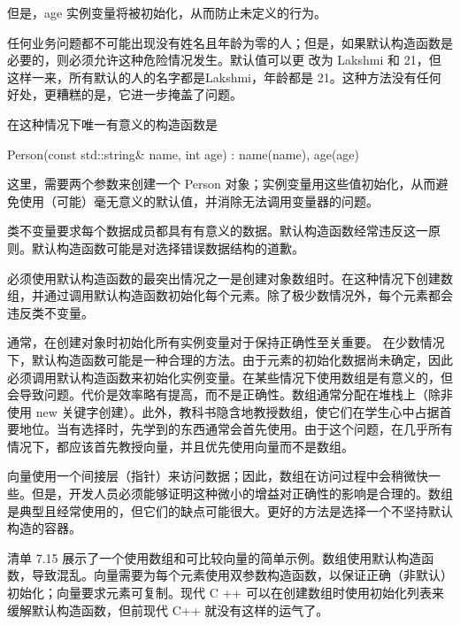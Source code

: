 但是，age 实例变量将被初始化，从而防止未定义的行为。


任何业务问题都不可能出现没有姓名且年龄为零的人；但是，如果默认构造函数是必要的，则必须允许这种危险情况发生。默认值可以更 改为 Lakshmi 和 21，但这样一来，所有默认的人的名字都是Lakshmi，年龄都是 21。这种方法没有任何好处，更糟糕的是，它进一步掩盖了问题。

在这种情况下唯一有意义的构造函数是

\begin{cpp}
Person(const std::string& name, int age) : name(name), age(age) {}
\end{cpp}

这里，需要两个参数来创建一个 Person 对象；实例变量用这些值初始化，从而避免使用（可能）毫无意义的默认值，并消除无法调用变量器的问题。

类不变量要求每个数据成员都具有有意义的数据。默认构造函数经常违反这一原则。默认构造函数可能是对选择错误数据结构的道歉。

必须使用默认构造函数的最突出情况之一是创建对象数组时。在这种情况下创建数组，并通过调用默认构造函数初始化每个元素。除了极少数情况外，每个元素都会违反类不变量。


通常，在创建对象时初始化所有实例变量对于保持正确性至关重要。
在少数情况下，默认构造函数可能是一种合理的方法。由于元素的初始化数据尚未确定，因此必须调用默认构造函数来初始化实例变量。在某些情况下使用数组是有意义的，但会导致问题。代价是效率略有提高，而不是正确性。数组通常分配在堆栈上（除非使用 new 关键字创建）。此外，教科书隐含地教授数组，使它们在学生心中占据首要地位。当有选择时，先学到的东西通常会首先使用。由于这个问题，在几乎所有情况下，都应该首先教授向量，并且优先使用向量而不是数组。

向量使用一个间接层（指针）来访问数据；因此，数组在访问过程中会稍微快一些。但是，开发人员必须能够证明这种微小的增益对正确性的影响是合理的。数组是典型且经常使用的，但它们的缺点可能很大。更好的方法是选择一个不坚持默认构造的容器。

清单 7.15 展示了一个使用数组和可比较向量的简单示例。数组使用默认构造函数，导致混乱。向量需要为每个元素使用双参数构造函数，以保证正确（非默认）初始化；向量要求元素可复制。现代 C ++ 可以在创建数组时使用初始化列表来缓解默认构造函数，但前现代 C++ 就没有这样的运气了。


